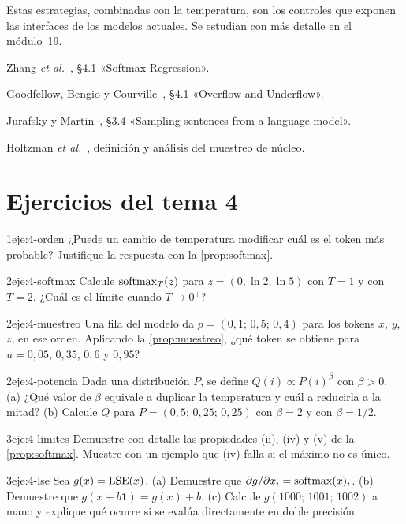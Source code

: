 Estas estrategias, combinadas con la temperatura, son los controles que exponen las interfaces de los modelos actuales. Se estudian con más detalle en el módulo~19.

\begin{lecturas}
\item Zhang \emph{et al.}~\cite{d2l}, §4.1 «Softmax Regression».
\item Goodfellow, Bengio y Courville~\cite{gbc}, §4.1 «Overflow and Underflow».
\item Jurafsky y Martin~\cite{jm3}, §3.4 «Sampling sentences from a language model».
\item Holtzman \emph{et al.}~\cite{holtzman}, definición y análisis del muestreo de núcleo.
\end{lecturas}

\section*{Ejercicios del tema 4}

\begin{ejercicio}{1}{eje:4-orden}
¿Puede un cambio de temperatura modificar cuál es el token más probable? Justifique la respuesta con la \cref{prop:softmax}.
\end{ejercicio}

\begin{ejercicio}{2}{eje:4-softmax}
Calcule $\operatorname{softmax}_T(z)$ para $z=(0,\ln 2,\ln 5)$ con $T=1$ y con $T=2$. ¿Cuál es el límite cuando $T\to 0^{+}$?
\end{ejercicio}

\begin{ejercicio}{2}{eje:4-muestreo}
Una fila del modelo da $p=(0{,}1;\,0{,}5;\,0{,}4)$ para los tokens $x$, $y$, $z$, en ese orden. Aplicando la \cref{prop:muestreo}, ¿qué token se obtiene para $u=0{,}05$, $0{,}35$, $0{,}6$ y $0{,}95$?
\end{ejercicio}

\begin{ejercicio}{2}{eje:4-potencia}
Dada una distribución $P$, se define $Q(i)\propto P(i)^{\beta}$ con $\beta>0$. (a) ¿Qué valor de $\beta$ equivale a duplicar la temperatura y cuál a reducirla a la mitad? (b) Calcule $Q$ para $P=(0{,}5;\,0{,}25;\,0{,}25)$ con $\beta=2$ y con $\beta=1/2$.
\end{ejercicio}

\begin{ejercicio}{3}{eje:4-limites}
Demuestre con detalle las propiedades (ii), (iv) y (v) de la \cref{prop:softmax}. Muestre con un ejemplo que (iv) falla si el máximo no es único.
\end{ejercicio}

\begin{ejercicio}{3}{eje:4-lse}
Sea $g(x)=\operatorname{LSE}(x)$. (a) Demuestre que $\partial g/\partial x_i=\operatorname{softmax}(x)_i$. (b) Demuestre que $g(x+b\mathbf{1})=g(x)+b$. (c) Calcule $g(1000;\,1001;\,1002)$ a mano y explique qué ocurre si se evalúa directamente en doble precisión.
\end{ejercicio}
